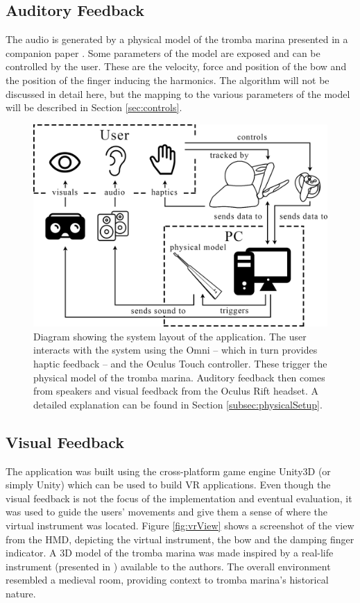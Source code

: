 \subsection{Auditory Feedback}
The audio is generated by a physical model of the tromba marina presented in a companion paper \cite{Willemsen2020}. Some parameters of the model are exposed and can be controlled by the user. These are the velocity, force and position of the bow and the position of the finger inducing the harmonics. The algorithm will not be discussed in detail here, but the mapping to the various parameters of the model will be described in Section \ref{sec:controls}.
\begin{figure}[h]\includegraphics[width=\paperFigWidth\textwidth]{figures/blockdiagram.png}
\centering
    \caption{Diagram showing the system layout of the application. The user interacts with the system using the Omni -- which in turn provides haptic feedback -- and the Oculus Touch controller. These trigger the physical model of the tromba marina. Auditory feedback then comes from speakers and visual feedback from the Oculus Rift headset. A detailed explanation can be found in Section \ref{subsec:physicalSetup}. \label{fig:systemLayout}}
\end{figure}
\subsection{Visual Feedback}
The application was built using the cross-platform game engine Unity3D (or simply Unity) \cite{unity} which can be used to build VR applications. Even though the visual feedback is not the focus of the implementation and eventual evaluation, it was used to guide the users' movements and give them a sense of where the virtual instrument was located. Figure \ref{fig:vrView} shows a screenshot of the view from the HMD, depicting the virtual instrument, the bow and the damping finger indicator. A 3D model of the tromba marina was made inspired by a real-life instrument (presented in \cite{Baldwin2016}) available to the authors. The overall environment resembled a medieval room, providing context to tromba marina's historical nature.


